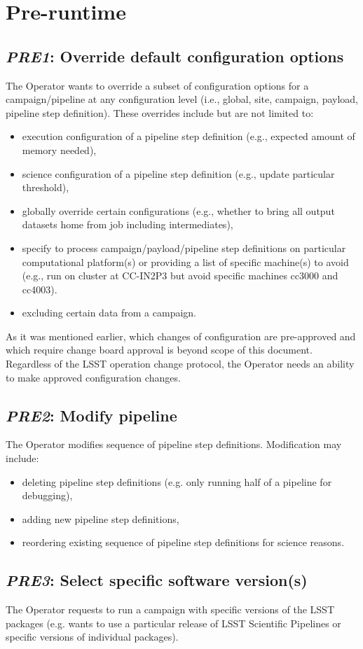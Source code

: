 \documentclass[DM,toc]{lsstdoc}
\newcommand{\usecase}[2]{\subsection{\emph{#1}: #2}\label{use:#1}}
\begin{document}
\section{Pre-runtime}

\usecase{PRE1}{Override default configuration options}
The Operator wants to override a subset of configuration options for a
campaign/pipeline at any configuration level (i.e., global, site, campaign,
payload, pipeline step definition).  These overrides include but are not
limited to:
\begin{itemize}
  \item
    execution configuration of a pipeline step definition (e.g., expected
    amount of memory needed),
  \item
    science configuration of a pipeline step definition (e.g., update
    particular threshold),
  \item
    globally override certain configurations (e.g., whether to bring all output
    datasets home from job including intermediates),
  \item
    specify to process campaign/payload/pipeline step definitions on particular
    computational platform(s) or providing a list of specific machine(s) to
    avoid (e.g., run on cluster at CC-IN2P3 but avoid specific machines cc3000
    and cc4003).
  \item
    excluding certain data from a campaign.
\end{itemize}
As it was mentioned earlier, which changes of configuration are pre-approved
and which require change board approval is beyond scope of this document.
Regardless of the LSST operation change protocol, the Operator needs an ability 
to make approved configuration changes.


\usecase{PRE2}{Modify pipeline}
The Operator modifies sequence of pipeline step definitions. Modification may
include: 
\begin{itemize}
  \item
    deleting pipeline step definitions (e.g. only running half of a pipeline
    for debugging),
  \item
    adding new pipeline step definitions,
  \item
    reordering existing sequence of pipeline step definitions for science
    reasons.
\end{itemize}

\usecase{PRE3}{Select specific software version(s)}
The Operator requests to run a campaign with specific versions of the
LSST packages (e.g. wants to use a particular release of LSST Scientific
Pipelines or specific versions of individual packages).
\end{document}
